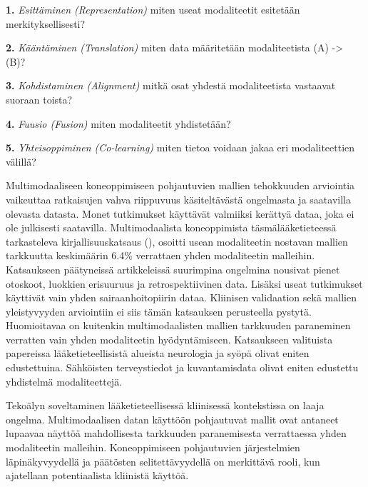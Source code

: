 \textbf{1.} \textit{Esittäminen (Representation)} miten useat modaliteetit esitetään merkityksellisesti?

\textbf{2.} \textit{Kääntäminen (Translation)} miten data määritetään modaliteetista (A) -> (B)?

\textbf{3.} \textit{Kohdistaminen (Alignment)} mitkä osat yhdestä modaliteetista vastaavat suoraan toista?

\textbf{4.} \textit{Fuusio (Fusion)} miten modaliteetit yhdistetään?

\textbf{5.} \textit{Yhteisoppiminen (Co-learning)} miten tietoa voidaan jakaa eri modaliteettien välillä?

Multimodaaliseen koneoppimiseen pohjautuvien mallien tehokkuuden arviointia vaikeuttaa ratkaisujen vahva riippuvuus käsiteltävästä ongelmasta ja saatavilla olevasta datasta. Monet tutkimukset käyttävät valmiiksi kerättyä dataa, joka ei ole julkisesti saatavilla. Multimodaalista koneoppimista täsmälääketieteessä tarkasteleva kirjallisuuskatsaus (\cite{articlePreciRev}), osoitti usean modaliteetin nostavan mallien tarkkuutta keskimäärin 6.4\% verrattaen yhden modaliteetin malleihin. Katsaukseen päätyneissä artikkeleissä suurimpina ongelmina nousivat pienet otoskoot, luokkien erisuuruus ja retrospektiivinen data. Lisäksi useat tutkimukset käyttivät vain yhden sairaanhoitopiirin dataa. Kliinisen validaation sekä mallien yleistyvyyden arviointiin ei siis tämän katsauksen perusteella pystytä. Huomioitavaa on kuitenkin multimodaalisten mallien tarkkuuden paraneminen verratten vain yhden modaliteetin hyödyntämiseen. Katsaukseen valituista papereissa lääketieteellisistä alueista neurologia ja syöpä olivat eniten edustettuina. Sähköisten terveystiedot ja kuvantamisdata olivat eniten edustettu yhdistelmä modaliteettejä.

Tekoälyn soveltaminen lääketieteellisessä kliinisessä kontekstissa on laaja ongelma. Multimodaalisen datan käyttöön pohjautuvat mallit ovat antaneet lupaavaa näyttöä mahdollisesta tarkkuuden paranemisesta verrattaessa yhden modaliteetin malleihin. Koneoppimiseen pohjautuvien järjestelmien läpinäkyvyydellä ja päätösten selitettävyydellä on merkittävä rooli, kun ajatellaan potentiaalista kliinistä käyttöä.